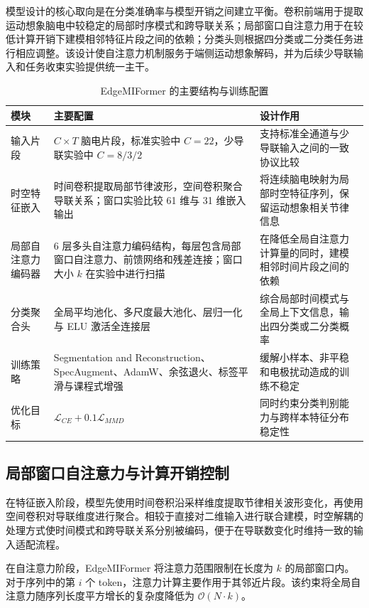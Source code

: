 模型设计的核心取向是在分类准确率与模型开销之间建立平衡。卷积前端用于提取运动想象脑电中较稳定的局部时序模式和跨导联关系；局部窗口自注意力用于在较低计算开销下建模相邻特征片段之间的依赖；分类头则根据四分类或二分类任务进行相应调整。该设计使自注意力机制服务于端侧运动想象解码，并为后续少导联输入和任务收束实验提供统一主干。

\begin{table}[htbp]
    \centering
    \small
    \caption{EdgeMIFormer 的主要结构与训练配置}
    \label{tab:edgemiformer_config}
    \begin{tabularx}{\textwidth}{p{2.6cm}p{4.4cm}>{\raggedright\arraybackslash}X}
        \hline
        模块 & 主要配置 & 设计作用 \\
        \hline
        输入片段 & $C \times T$ 脑电片段，标准实验中 $C=22$，少导联实验中 $C=8/3/2$ & 支持标准全通道与少导联输入之间的一致协议比较 \\
        时空特征嵌入 & 时间卷积提取局部节律波形，空间卷积聚合导联关系；窗口实验比较 61 维与 31 维嵌入输出 & 将连续脑电映射为局部时空特征序列，保留运动想象相关节律信息 \\
        局部自注意力编码器 & 6 层多头自注意力编码结构，每层包含局部窗口自注意力、前馈网络和残差连接；窗口大小 $k$ 在实验中进行扫描 & 在降低全局自注意力计算量的同时，建模相邻时间片段之间的依赖 \\
        分类聚合头 & 全局平均池化、多尺度最大池化、层归一化与 ELU 激活全连接层 & 综合局部时间模式与全局上下文信息，输出四分类或二分类概率 \\
        训练策略 & Segmentation and Reconstruction、SpecAugment、AdamW、余弦退火、标签平滑与课程式增强 & 缓解小样本、非平稳和电极扰动造成的训练不稳定 \\
        优化目标 & $\mathcal{L}_{CE}+0.1\mathcal{L}_{MMD}$ & 同时约束分类判别能力与跨样本特征分布稳定性 \\
        \hline
    \end{tabularx}
\end{table}

\subsection{局部窗口自注意力与计算开销控制}
在特征嵌入阶段，模型先使用时间卷积沿采样维度提取节律相关波形变化，再使用空间卷积对导联维度进行聚合。相较于直接对二维输入进行联合建模，时空解耦的处理方式使时间模式和跨导联关系分别被编码，便于在导联数变化时维持一致的输入适配流程。

在自注意力阶段，EdgeMIFormer 将注意力范围限制在长度为 $k$ 的局部窗口内。对于序列中的第 $i$ 个 token，注意力计算主要作用于其邻近片段。该约束将全局自注意力随序列长度平方增长的复杂度降低为 $\mathcal{O}(N \cdot k)$。

